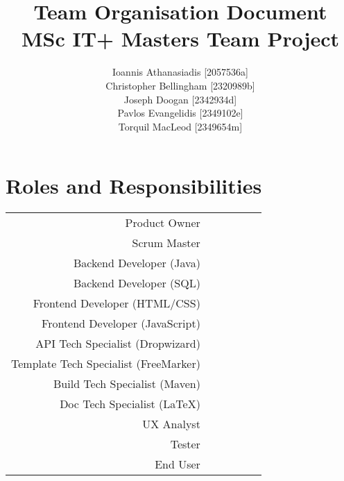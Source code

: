\documentclass[a4paper, 12pt, titlepage]{article}
\title{\textbf{Team Organisation Document} \\ MSc IT+ Masters Team Project}
\author{
    Ioannis Athanasiadis [2057536a] \\
    Christopher Bellingham [2320989b] \\
    Joseph Doogan [2342934d] \\
    Pavlos Evangelidis [2349102e] \\
    Torquil MacLeod [2349654m]
}
\newcommand{\rot}{\rotatebox{90}}
\newcommand{\y}{\ding{51}}
\begin{document}
    \maketitle

    \section{Roles and Responsibilities}
    \begin{center}
        \begin{tabular}{r*{5}c}
            & \rot{Ioannis Athanasiadis} & \rot{Christopher Bellingham} 
            & \rot{Joseph Doogan} & \rot{Pavlos Evangelidis} & \rot{Torquil MacLeod} \\
            \hline
            Product Owner                               &    &    &    & \y &    \\
            Scrum Master                                &    & \y &    &    &    \\
            Backend Developer (Java)                    & \y & \y & \y & \y & \y \\
            Backend Developer (SQL)                     & \y &    & \y & \y & \y \\
            Frontend Developer (HTML/CSS)               & \y &    & \y &    & \y \\
            Frontend Developer (JavaScript)             & \y &    & \y & \y &    \\
            API Tech Specialist (Dropwizard)            &    &    &    &    & \y \\
            Template Tech Specialist (FreeMarker)       &    &    &    &    & \y \\
            Build Tech Specialist (Maven)               &    & \y & \y & \y &    \\
            Doc Tech Specialist (LaTeX)                 & \y & \y &    & \y &    \\
            UX Analyst                                  &    &    & \y &    & \y \\
            Tester                                      & \y &    & \y &    &    \\
            End User                                    &    &    &    & \y &    \\
            \hline
        \end{tabular}
    \end{center}
\end{document}
